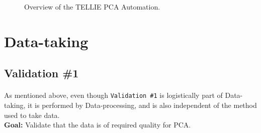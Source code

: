 \documentclass[12pt]{article}
\begin{document}
\begin{figure}
\centering
\noindent{}
  \caption{\centering Overview of the TELLIE PCA Automation.}
  \label{fig:overview}
\end{figure}

\section{Data-taking}
\subsection{Validation \#1}\label{sec:val1}
\paragraph{}
As mentioned above, even though \texttt{Validation \#1} is logistically part of Data-taking, it is performed by Data-processing, and is also independent of the method used to take data.\\
\textbf{Goal:} Validate that the data is of required quality for PCA.
\end{document}
